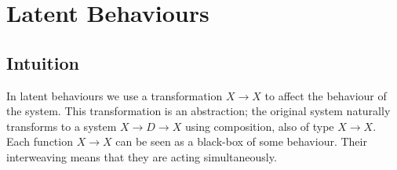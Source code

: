 \section{Latent Behaviours}
\subsection{Intuition}
In latent behaviours we use a transformation $X\rightarrow X$ to affect the behaviour of the system. This transformation is an abstraction; the original system naturally transforms to a system $X\rightarrow D \rightarrow X$ using composition, also of type $X\rightarrow X$. Each function $X\rightarrow X$ can be seen as a black-box of some behaviour. Their interweaving means that they are acting simultaneously. 






